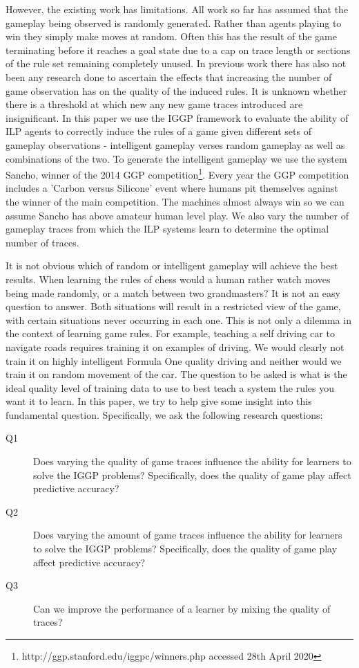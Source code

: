However, the existing work has limitations. All work so far has assumed that the gameplay being observed is randomly generated\cite{Cropper/IGGP}. Rather than agents playing to win they simply make moves at random. Often this has the result of the game terminating before it reaches a goal state due to a cap on trace length or sections of the rule set remaining completely unused. In previous work there has also not been any research done to ascertain the effects that increasing the number of game observation has on the quality of the induced rules. It is unknown whether there is a threshold at which new any new game traces introduced are insignificant. In this paper we use the IGGP framework to evaluate the ability of ILP agents to correctly induce the rules of a game given different sets of gameplay observations - intelligent gameplay verses random gameplay as well as combinations of the two. To generate the intelligent gameplay we use the system Sancho, winner of the 2014 GGP competition\footnote{http://ggp.stanford.edu/iggpc/winners.php accessed 28th April 2020}\cite{Sancho/Github}. Every year the GGP competition includes a 'Carbon versus Silicone' event where humans pit themselves against the winner of the main competition. The machines almost always win\cite{Genesereth/GGPOverview} so we can assume Sancho has above amateur human level play. We also vary the number of gameplay traces from which the ILP systems learn to determine the optimal number of traces.


It is not obvious which of random or intelligent gameplay will achieve the best results. When learning the rules of chess would a human rather watch moves being made randomly, or a match between two grandmasters? It is not an easy question to answer. Both situations will result in a restricted view of the game, with certain situations never occurring in each one. This is not only a dilemma in the context of learning game rules. For example, teaching a self driving car to navigate roads requires training it on examples of driving. We would clearly not train it on highly intelligent Formula One quality driving and neither would we train it on random movement of the car. The question to be asked is what is the ideal quality level of training data to use to best teach a system the rules you want it to learn. In this paper, we try to help give some insight into this fundamental question. Specifically, we ask the following research questions:

\begin{description}
\item[Q1] Does varying the quality of game traces influence the ability for learners to solve the IGGP problems? Specifically, does the quality of game play affect predictive accuracy?
\item[Q2] Does varying the amount of game traces influence the ability for learners to solve the IGGP problems? Specifically, does the quality of game play affect predictive accuracy?
\item[Q3] Can we improve the performance of a learner by mixing the quality of traces?
\end{description}

